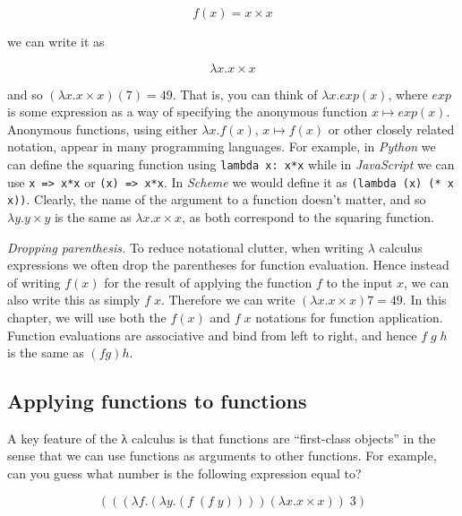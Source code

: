 \[
f(x) = x\times x
\]

we can write it as

\[
\lambda x. x\times x
\]

and so \((\lambda x.x\times x)(7)=49\). That is, you can think of
\(\lambda x. exp(x)\), where \(exp\) is some expression as a way of
specifying the anonymous function \(x \mapsto exp(x)\). Anonymous
functions, using either \(\lambda x.f(x)\), \(x \mapsto f(x)\) or other
closely related notation, appear in many programming languages. For
example, in \emph{Python} we can define the squaring function using
\texttt{lambda x: x*x} while in \emph{JavaScript} we can use
\texttt{x => x*x} or \texttt{(x) => x*x}. In \emph{Scheme} we would
define it as \texttt{(lambda (x) (* x x))}. Clearly, the name of the
argument to a function doesn't matter, and so \(\lambda y.y\times y\) is
the same as \(\lambda x.x \times x\), as both correspond to the squaring
function.

\emph{Dropping parenthesis.} To reduce notational clutter, when writing
\(\lambda\) calculus expressions we often drop the parentheses for
function evaluation. Hence instead of writing \(f(x)\) for the result of
applying the function \(f\) to the input \(x\), we can also write this
as simply \(f\; x\). Therefore we can write
\((\lambda x.x\times x) 7=49\). In this chapter, we will use both the
\(f(x)\) and \(f\; x\) notations for function application. Function
evaluations are associative and bind from left to right, and hence
\(f\;g\;h\) is the same as \((f g) h\).

\subsection{Applying functions to
functions}\label{Applying-functions-to-fun}

A key feature of the λ calculus is that functions are ``first-class
objects'' in the sense that we can use functions as arguments to other
functions. For example, can you guess what number is the following
expression equal to?

\[(((\lambda f.(\lambda y.(f \;(f\; y)))) (\lambda x. x\times x))\; 3) \label{lambdaexampleeq}\]


